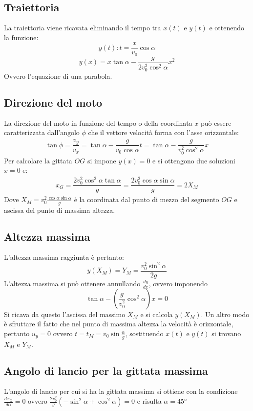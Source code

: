 \documentclass[class=book, crop=false, oneside, 12pt]{standalone}
\begin{document}
	\subsection{Traiettoria}
	La traiettoria viene ricavata eliminando il tempo tra $x(t)$ e $y(t)$ e ottenendo la funzione:
	$$y(t):t=\dfrac{x}{v_0}\cos\alpha$$
	$$y(x)=x\tan\alpha-\dfrac{g}{2v_0^2\cos^2\alpha}x^2$$
	Ovvero l'equazione di una parabola.
	\subsection{Direzione del moto}
	La direzione del moto in funzione del tempo o della coordinata $x$ pu\`o essere caratterizzata dall'angolo $\phi$ che il vettore velocit\`a forma con l'asse orizzontale:
	\begin{align*}
		\tan\phi=\dfrac{v_y}{v_x}=\tan\alpha-\dfrac{g}{v_0\cos\alpha}t=\tan\alpha-\dfrac{g}{v_0^2\cos^2\alpha}x
	\end{align*}
	Per calcolare la gittata $OG$ si impone $y(x)=0$ e si ottengono due soluzioni $x=0$ e:
	\begin{align*}
		x_G=\dfrac{2v_0^2\cos^2\alpha\tan\alpha}{g}=\dfrac{2v_0^2\cos\alpha\sin\alpha}{g}=2X_M
	\end{align*}
	Dove $X_M=v_0^2\frac{\cos\alpha\sin\alpha}{g}$ \`e la coordinata dal punto di mezzo del segmento $OG$ e ascissa del punto di massima altezza.
	\subsection{Altezza massima}
	L'altezza massima raggiunta \`e pertanto:
	$$y(X_M)=Y_M=\dfrac{v_0^2\sin^2\alpha}{2g}$$
	L'altezza massima si pu\`o ottenere annullando $\frac{dy}{dx}$, ovvero imponendo
	$$\tan\alpha-\left(\dfrac{g}{v_0^2}\cos^2\alpha\right)x=0$$
	Si ricava da questo l'ascissa del massimo $X_M$ e si calcola $y(X_M)$.
	Un altro modo \`e sfruttare il fatto che nel punto di massima altezza la velocit\`a \`e orizzontale, pertanto $u_y=0$ ovvero $t=t_M=v_0\sin\frac{\alpha}{g}$, sostituendo $x(t)$ e $y(t)$ si trovano $X_M$ e $Y_M$.
	\subsection{Angolo di lancio per la gittata massima}
	L'angolo di lancio per cui si ha la gittata massima si ottiene con la condizione $\frac{dx_G}{d\alpha}=0$ ovvero $\frac{2v_0^2}{g}(-\sin^2\alpha+\cos^2\alpha)=0$ e risulta $\alpha=45\si{\degree}$
\end{document}
